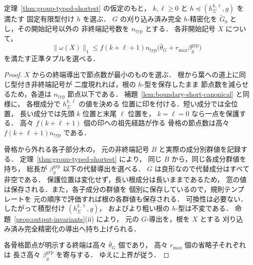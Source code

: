 \begin{lemma}[窓と任意有限群の型付けに対する短い正準タプル]
\label{lem:window-group-short}
定理~\ref{thm:group-typed-shortest} の仮定のもと，
$k,\ell\ge0$ と
$h\preceq(h_\Sigma^{k,\ell},g)$ を満たす
固定有限型付け $h$ を選ぶ．
$G$ の刈り込み済み完全 $h$-精密化を
$\widetilde G_0$ とし，その開始記号以外の
非終端記号数を $n_{\mathrm{typ}}$ とする．
各非開始記号 $X$ について，
\[
 \|\omega(X)\|_1\le
 f(k+\ell+1)n_{\mathrm{typ}}
 \bigl(\bar\theta_G+r_{\max}\beta_g^{\mathrm{grp}}\bigr)
\]
を満たす正準タプルを選べる．
\end{lemma}
\begin{proof}
$X$ からの終端導出で節点数が最小のものを選ぶ．
根から葉への道上に同じ型付き非終端記号が
二度現れれば，根の $h$-型を保存したまま
節点数を減らせるため，各道は
$n_{\mathrm{typ}}$ 節点以下である．
補題~\ref{lem:boundary-short-canonical} と同様に，
各根成分で $h_\Sigma^{k,\ell}$ の値を決める
位置に印を付ける．短い成分では全位置，
長い成分では先頭 $k$ 位置と末尾 $\ell$ 位置を，
$k=\ell=0$ なら一点を保護する．
高々 $f(k+\ell+1)$ 個の印への祖先経路が作る
骨格の節点数は高々
$f(k+\ell+1)n_{\mathrm{typ}}$ である．

骨格から外れる各子部分木の，
元の非終端記号 $B$ と実際の成分別群値を記録する．
定理~\ref{thm:group-typed-shortest} により，
同じ $B$ から，同じ各成分群値を持ち，
総長が $\beta_g^{\mathrm{grp}}$ 以下の代替導出を選べる．
$G$ は良形なので代替成分はすべて非空である．
保護位置は変化せず，長い根成分は長いままであるため，
窓の値は保存される．また，各子成分の群値を
個別に保存しているので，規則テンプレートを
元の順序で評価すれば根の各群値も保存される．
可換性は必要ない．
したがって積型付け $(h_\Sigma^{k,\ell},g)$，
およびより粗い根の $h$-型は不変である．
命題~\ref{prop:output-invariants}(ii) により，
元の $G$-導出を，根を $X$ とする
刈り込み済み完全精密化の導出へ持ち上げられる．

各骨格節点が明示する終端は高々
$\bar\theta_G$ 個であり，
高々 $r_{\max}$ 個の省略子それぞれは
長さ高々 $\beta_g^{\mathrm{grp}}$ を寄与する．
ゆえに上界が従う．
\end{proof}

